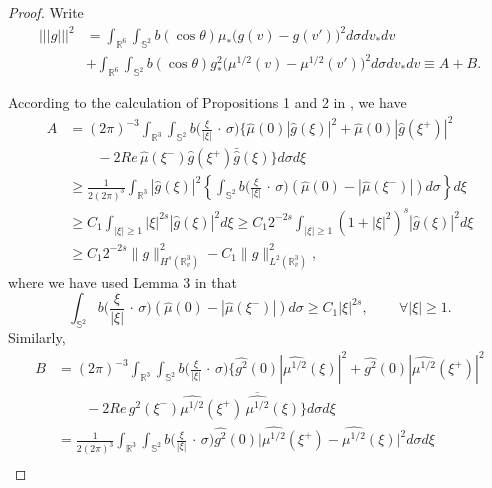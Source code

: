 \documentclass{amsart}[12pt, article]
\begin{document}
\begin{proof} Write
\begin{align*}\label{radja-3}
||| g|||^2 &= \int_{{{{\mathbb R}}}^{6}}\int_{\mathbb S^{2}}b(\cos\theta)
\mu_*\Big(g(v)-g(v')\Big)^2
d\sigma d v_* d v \\
&+ \int_{{{{\mathbb R}}}^{6}}\int_{\mathbb S^{2}}b(\cos\theta)
g^2_*\Big(\mu^{1/2}(v)-\mu^{1/2}(v')\Big)^2
d\sigma d v_* d v \equiv A+B.\nonumber
\end{align*}

 According to the calculation of  Propositions 1 and  2 in \cite{al-1},
 we have
\begin{align*}
A
&=(2\pi)^{-3}\int_{{{{\mathbb R}}}^{3}}\int_{\mathbb
S^{2}}b\Big(\frac{\xi}{|\xi|} \,\cdot\,\sigma\Big) \Big\{
\hat{\mu}(0)|\hat{g}(\xi)|^2+\hat{\mu}(0)|\hat{g}(\xi^+)|^2\\
&\qquad-2Re\,\hat{\mu}(\xi^-) \hat{g}(\xi^+)\bar{\hat{g}}(\xi)\Big\} d\sigma d \xi\\
&\geq \frac{1}{2(2\pi)^{3}} \int_{{{{\mathbb R}}}^{3}} |\hat{g}(\xi)|^2
\left\{\int_{\mathbb S^{2}}b\Big(\frac{\xi}{|\xi|}
\,\cdot\,\sigma\Big) (\hat{\mu}(0)- |\hat{\mu}(\xi^-)|) d\sigma\right\}
d \xi
\\
&\geq C_1 \int_{|\xi|\geq 1}|\xi|^{2s} |\hat{g}(\xi)|^2d \xi
\geq C_1 2^{-2s} \int_{|\xi|\geq 1}(1+|\xi|^2)^{s} |\hat{g}(\xi)|^2 d \xi\\
&\geq C_1 2^{-2s}\|g\|^2_{H^s({{{\mathbb R}}}^3_v)}-C_1\|g\|^2_{L^2({{{\mathbb R}}}^3_v)},
\end{align*}
where we have used Lemma 3 in \cite{al-1}  that
\begin{equation}\label{lemma3}
\int_{\mathbb S^{2}}b\Big(\frac{\xi}{|\xi|}
\,\cdot\,\sigma\Big) (\hat{\mu}(0)- |\hat{\mu}(\xi^-)|) d\sigma
\geq C_1|\xi|^{2s},\qquad\,\forall |\xi|\geq 1.
\end{equation}
Similarly,
\begin{align*}
B
&=(2\pi)^{-3}\int_{{{{\mathbb R}}}^{3}}\int_{\mathbb
S^{2}}b\Big(\frac{\xi}{|\xi|} \,\cdot\,\sigma\Big) \Big\{
\widehat{g^2}(0)|\widehat{\mu^{1/2}}(\xi)|^2+\widehat{g^2}(0)
|\widehat{\mu^{1/2}}(\xi^+)|^2\\
&\qquad-2Re\,\widehat{g^2}(\xi^-) \widehat{\mu^{1/2}}(\xi^+)\,
\overline{\widehat{\mu^{1/2}}}
(\xi)\Big\} d\sigma d \xi\\
&= \frac{1}{2(2\pi)^{3}} \int_{{{{\mathbb R}}}^{3}}\int_{\mathbb S^{2}}
b\Big(\frac{\xi}{|\xi|}
\,\cdot\,\sigma\Big)\widehat{g^2}(0) \big|\widehat{\mu^{1/2}}(\xi^+)-
\widehat{\mu^{1/2}}(\xi)\big|^2 d\sigma d \xi
\\

\end{align*}
\end{proof}
\end{document}
